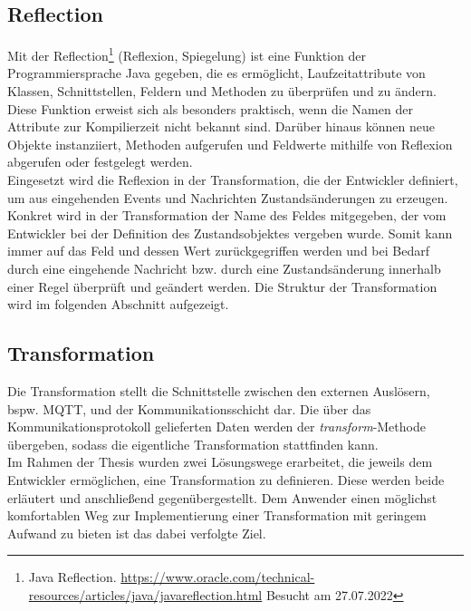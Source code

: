 \subsection{Reflection} 
\label{subsec:reflection}
    Mit der Reflection\footnote{Java Reflection. \url{https://www.oracle.com/technical-resources/articles/java/javareflection.html} Besucht am 27.07.2022} 
    (Reflexion, Spiegelung) ist eine Funktion der Programmiersprache Java gegeben, die es ermöglicht, Laufzeitattribute von Klassen, Schnittstellen, Feldern 
    und Methoden zu überprüfen und zu ändern. Diese Funktion erweist sich als besonders praktisch, wenn die Namen der Attribute zur Kompilierzeit nicht bekannt sind. 
    Darüber hinaus können neue Objekte instanziiert, Methoden aufgerufen und Feldwerte mithilfe von Reflexion abgerufen oder festgelegt werden. 
    \\
    \linebreak
    Eingesetzt wird die Reflexion in der Transformation, die der Entwickler definiert, um aus eingehenden Events und Nachrichten Zustandsänderungen zu erzeugen. Konkret wird in der 
    Transformation der Name des Feldes mitgegeben, der vom Entwickler bei der Definition des Zustandsobjektes vergeben wurde. Somit kann immer auf das Feld und dessen Wert 
    zurückgegriffen werden und bei Bedarf durch eine eingehende Nachricht bzw. durch eine Zustandsänderung innerhalb einer Regel überprüft und geändert werden. Die Struktur der 
    Transformation wird im folgenden Abschnitt aufgezeigt.

\subsection{Transformation}
\label{subsec:transformation}
    Die Transformation stellt die Schnittstelle zwischen den externen Auslösern, bspw. \acs{MQTT}, und der Kommunikationsschicht dar. 
    Die über das Kommunikationsprotokoll gelieferten Daten werden der \textit{transform}-Methode übergeben, sodass die eigentliche 
    Transformation stattfinden kann. %
    \\
    \linebreak
    Im Rahmen der Thesis wurden zwei Lösungswege erarbeitet, die jeweils dem Entwickler ermöglichen, eine Transformation zu definieren. Diese werden beide 
    erläutert und anschließend gegenübergestellt. Dem Anwender einen möglichst komfortablen Weg zur Implementierung einer Transformation mit geringem Aufwand zu bieten ist das dabei verfolgte Ziel. 

